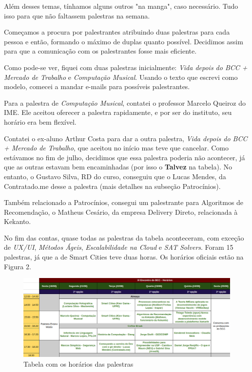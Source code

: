 \documentclass[12pt,letterpaper]{article}
\begin{document}
	Além desses temas, tínhamos alguns outros "na manga", caso necessário. Tudo isso para que não faltassem palestras na semana.
	
	Começamos a procura por palestrantes atribuindo duas palestras para cada pessoa e então, formando o máximo de duplas quanto possível. Decidimos assim para que a comunicação com os palestrantes fosse mais eficiente. 
	
	Como pode-se ver, fiquei com duas palestras inicialmente: \textit{Vida depois do BCC + Mercado de Trabalho} e \textit{Computação Musical}. Usando o texto que escrevi como modelo\cite{modelo_palestras}, comecei a mandar e-mails para possíveis palestrantes. 
	
	Para a palestra de \textit{Computação Musical}, contatei o professor Marcelo Queiroz do IME. Ele aceitou oferecer a palestra rapidamente, e por ser do instituto, seu horário era bem flexível.
	
	Contatei o ex-aluno Arthur Costa para dar a outra palestra, \textit{Vida depois do BCC + Mercado de Trabalho}, que aceitou no início mas teve que cancelar. Como estávamos no fim de julho, decidimos que essa palestra poderia não acontecer, já que as outras estavam bem encaminhadas (por isso o \textbf{{\color{orange} Talvez}} na tabela). No entanto, o Gustavo Silva, RD do curso, conseguiu que o Lucas Mendes, da Contratado.me desse a palestra (mais detalhes na subseção Patrocínios).
	
	Também relacionado a Patrocínios, consegui um palestrante para Algoritmos de Recomendação, o Matheus Cesário, da empresa Delivery Direto, relacionada à Kekanto.
	
	No fim das contas, quase todas as palestras da tabela aconteceram, com exceção de \textit{UX/UI}, \textit{Métodos Ágeis}, \textit{Escalabilidade na Cloud} e \textit{SAT Solvers}. Foram 15 palestras, já que a de Smart Cities teve duas horas. Os horários oficiais estão na Figura 2.
	
	\begin{figure}
		\begin{center}
			\includegraphics[scale=0.43]{horarios.png} 
			\caption{Tabela com os horários das palestras}
		\end{center}
	\end{figure}
\end{document}
